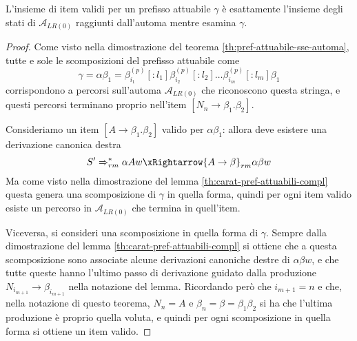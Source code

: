 \documentclass[12pt]{article}
\numberwithin{theorem}{subsection}
\begin{document}
\begin{lemma}
	L'insieme di item validi per un prefisso attuabile $\gamma$ è esattamente l'insieme degli stati di $\mathcal{A}_{LR(0)}$ raggiunti dall'automa mentre esamina $\gamma$.
\end{lemma}
\begin{proof}
	Come visto nella dimostrazione del teorema \ref{th:pref-attuabile-sse-automa}, tutte e sole le scomposizioni del prefisso attuabile come
	\[
	\gamma = \alpha\beta_1 = \beta_{i_1}^{(p)}[:l_1] \beta_{i_2}^{(p)}[:l_2] \dots \beta_{i_m}^{(p)}[:l_m]\beta_1
	\]
	corrispondono a percorsi sull'automa $\mathcal{A}_{LR(0)}$ che riconoscono questa stringa, e questi percorsi terminano proprio nell'item $[ N_n \rightarrow \beta_1 . \beta_2 ]$.

	Consideriamo un item $[ A \rightarrow \beta_1 . \beta_2 ]$ valido per $\alpha \beta_1$: allora deve esistere una derivazione canonica destra
	\[
	S' \Rightarrow_{rm}^* \alpha A w \xRightarrow{A \rightarrow \beta}_{rm} \alpha \beta w
	\]
	Ma come visto nella dimostrazione del lemma \ref{th:carat-pref-attuabili-compl} questa genera una scomposizione di $\gamma$ in quella forma, quindi per ogni item valido esiste un percorso in $\mathcal{A}_{LR(0)}$ che termina in quell'item.
	
	Viceversa, si consideri una scomposizione in quella forma di $\gamma$. Sempre dalla dimostrazione del lemma \ref{th:carat-pref-attuabili-compl} si ottiene che a questa scomposizione sono associate alcune derivazioni canoniche destre di $\alpha \beta w$, e che tutte queste hanno l'ultimo passo di derivazione guidato dalla produzione $N_{i_{m+1}} \rightarrow \beta_{i_{m+1}}$ nella notazione del lemma. Ricordando però che $i_{m+1} = n$ e che, nella notazione di questo teorema, $N_n = A$ e $\beta_n = \beta = \beta_1 \beta_2$ si ha che l'ultima produzione è proprio quella voluta, e quindi per ogni scomposizione in quella forma si ottiene un item valido.
\end{proof}
\end{document}

